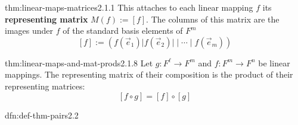 \documentclass[landscape, 8pt]{extarticle}
\DeclareMathOperator{\Mat}{Mat}
\begin{document}
\begin{multicols}{3}
\begin{thm}{thm:linear-maps-matrices}{2.1.1}
    This attaches to each linear mapping $f$ its \textbf{representing matrix} $M(f) := [f]$. The columns of this matrix are the images under $f$ of the standard basis elements of $F^{m}$
    \[[f] := (f(\vec{e}_{1}) \lvert f(\vec{e}_{2}) \rvert \mid \cdots \mid f(\vec{e}_{m}))\]
\end{thm}




\begin{thm}{thm:linear-maps-and-mat-prods}{2.1.8}
    Let $g : F^{\ell}\to F^{m}$ and $f : F^{m} \to F^{n}$ be linear mappings. The representing matrix of their composition is the product of their representing matrices:
    \[[f \circ g] = [f] \circ [g]\]
    
\end{thm}

\newpage


\begin{dfn}{dfn:def-thm-pairs}{2.2}


\end{dfn}
\end{multicols}
\end{document}
